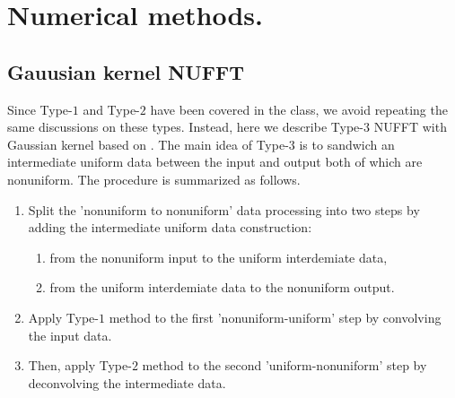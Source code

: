 \section{Numerical methods.}


\subsection{Gauusian kernel NUFFT}
Since Type-$1$ and Type-$2$ have been covered in the class, we avoid repeating the same discussions on these types.
Instead, here we describe Type-$3$ NUFFT with Gaussian kernel based on \cite{JCP-2003-Greengard}.
The main idea of Type-$3$ is to sandwich an intermediate uniform data between the input and output both of which are nonuniform.
The procedure is summarized as follows.
\begin{enumerate}
  \item Split the 'nonuniform to nonuniform' data processing into two steps
  by adding the intermediate uniform data construction:
  \begin{enumerate}
    \item from the nonuniform input to the uniform interdemiate data,
    \item from the uniform interdemiate data to the nonuniform output.
  \end{enumerate}
  \item Apply Type-$1$ method to the first 'nonuniform-uniform' step by convolving the input data.
  \item Then, apply Type-$2$ method to the second 'uniform-nonuniform' step by deconvolving the intermediate data.
\end{enumerate}

